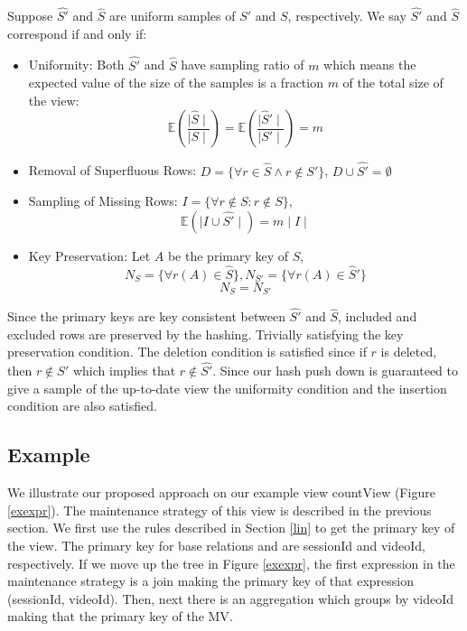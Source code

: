 \begin{definition}[Correspondence]
Suppose $\widehat{S'}$ and $\widehat{S}$ are uniform samples of $S'$ and $S$, respectively.  We say $\widehat{S'}$ and $\widehat{S}$ correspond if and only if:
\vspace{-.25em}
\begin{itemize}[noitemsep]
\item Uniformity: Both $\widehat{S'}$ and $\widehat{S}$ have sampling ratio of $m$ which means the expected value of the size of the samples is a fraction $m$ of the total size of the view: \[\mathbb{E}(\frac{\mid\widehat{S}\mid}{\mid S \mid}) = \mathbb{E}(\frac{\mid\widehat{S}'\mid}{\mid S' \mid}) = m\] 
\item Removal of Superfluous Rows: $D = \{\forall r \in \widehat{S} \wedge r \not\in S'\}$, $D \cup \widehat{S'} = \emptyset$ 
\item Sampling of Missing Rows: $I = \{\forall r \not\in S : r \not \in S\}$, \[\mathbb{E}(\mid I \cup \widehat{S'} \mid) = m\mid I \mid \]
\item Key Preservation: Let $A$ be the primary key of $S$, \[N_S = \{\forall r(A) \in \widehat{S}\}, N_{S'} = \{\forall r(A) \in \widehat{S}'\}\] \[N_S = N_{S'}\]
\end{itemize}
\vspace{-.25em}
\label{correspondence}
\end{definition}


Since the primary keys are key consistent between $\hat{S'}$ and $\hat{S}$, included and excluded rows are preserved by the hashing.
Trivially satisfying the key preservation condition.
The deletion condition is satisfied since if $r$ is deleted, then $r \not \in S'$ which implies that $r \not\in \hat{S'}$.
Since our hash push down is guaranteed to give a sample of the up-to-date view the uniformity condition and the insertion condition are also satisfied.

\subsection{Example}
We illustrate our proposed approach on our example view \textsf{countView} (Figure \ref{exexpr}).
The maintenance strategy of this view is described in the previous section.
We first use the rules described in Section \ref{lin} to get the primary key of the view.  
The primary key for base relations  and  are \textsf{sessionId} and \textsf{videoId}, respectively.
If we move up the tree in Figure \ref{exexpr}, the first expression in the maintenance strategy is a join making the primary key of that expression (\textsf{sessionId}, \textsf{videoId}).
Then, next there is an aggregation which groups by \textsf{videoId} making that the primary key of the MV.

